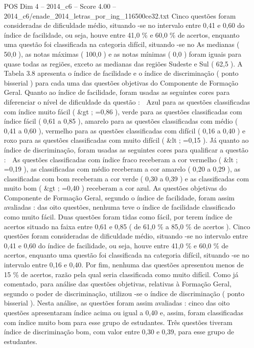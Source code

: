\begin{textsample}{POS Dim 4 – 2014\_c6 – Score 4.00 – 2014\_c6/enade\_2014\_letras\_por\_ing\_116500ce32.txt}
Cinco questões foram consideradas de dificuldade médio, situando -se no intervalo entre 0,41 e 0,60 do índice de facilidade, ou seja, houve entre 41,0 \% e 60,0 \% de acertos, enquanto uma questão foi classificada na categoria difícil, situando -se no As medianas ( 50,0 ), as notas máximas ( 100,0 ) e as notas mínimas ( 0,0 ) foram iguais para quase todas as regiões, exceto as medianas das regiões Sudeste e Sul ( 62,5 ).
A Tabela 3.8 apresenta o índice de facilidade e o índice de discriminação ( ponto bisserial ) para cada uma das questões objetivas do Componente de Formação Geral.
Quanto ao índice de facilidade, foram usadas as seguintes cores para diferenciar o nível de dificuldade da questão :  Azul para as questões classificadas com índice muito fácil ( \&gt ; =0,86 ), verde para as questões classificadas com índice fácil ( 0,61 a 0,85 ), amarelo para as questões classificadas com médio ( 0,41 a 0,60 ), vermelho para as questões classificadas com difícil ( 0,16 a 0,40 ) e roxo para as questões classificadas com muito difícil ( \&lt ; =0,15 ).
Já quanto ao índice de discriminação, foram usadas as seguintes cores para qualificar a questão :  As questões classificadas com índice fraco receberam a cor vermelho ( \&lt ; =0,19 ), as classificadas com médio receberam a cor amarelo ( 0,20 a 0,29 ), as classificadas com bom receberam a cor verde ( 0,30 a 0,39 ) e as classificadas com muito bom ( \&gt ; =0,40 ) receberam a cor azul.
As questões objetivas do Componente de Formação Geral, segundo o índice de facilidade, foram assim avaliadas : das oito questões, nenhuma teve o índice de facilidade classificado como muito fácil.
Duas questões foram tidas como fácil, por terem índice de acertos situado na faixa entre 0,61 e 0,85 ( de 61,0 \% a 85,0 \% de acertos ).
Cinco questões foram consideradas de dificuldade médio, situando -se no intervalo entre 0,41 e 0,60 do índice de facilidade, ou seja, houve entre 41,0 \% e 60,0 \% de acertos, enquanto uma questão foi classificada na categoria difícil, situando -se no intervalo entre 0,16 e 0,40.
Por fim, nenhuma das questões apresentou menos de 15 \% de acertos, razão pela qual seria classificada como muito difícil.
Como já comentado, para análise das questões objetivas, relativas à Formação Geral, segundo o poder de discriminação, utilizou -se o índice de discriminação ( ponto bisserial ).
Nesta análise, as questões foram assim avaliadas : cinco das oito questões apresentaram índice acima ou igual a 0,40 e, assim, foram classificadas com índice muito bom para esse grupo de estudantes.
Três questões tiveram índice de discriminação bom, com valor entre 0,30 e 0,39, para esse grupo de estudantes.

\end{textsample}
